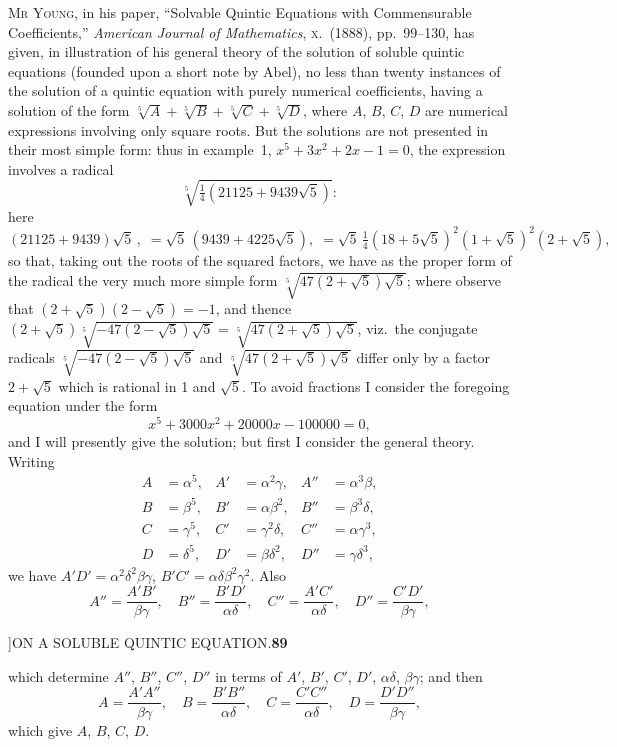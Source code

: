 \documentclass[11pt]{article}
\begin{document}
\hspace{1em} M\textsc{r} Y\textsc{oung}, in his paper, ``Solvable Quintic
Equations with Commensurable Coefficients,'' \emph{American Journal of
Mathematics}, \textsc{x}.\ (1888), pp.\ 99--130, has given, in illustration of
his general theory of the solution of soluble quintic equations (founded upon
a short note by Abel), no less than twenty instances of the solution of a
quintic equation with purely numerical coefficients, having a solution of the
form $\sqrt[5]{A}+\sqrt[5]{B}+\sqrt[5]{C}+\sqrt[5]{D}$, where $A$, $B$, $C$,
$D$ are numerical expressions involving only square roots. But the solutions
are not presented in their most simple form: thus in example~1,
$x^{5}+3x^{2}+2x-1=0$, the expression involves a radical
\[
\sqrt[5]{\tfrac{1}{4}(21125+9439\sqrt{5})}:
\]
here
\[
(21125+9439)\sqrt{5}\,,\;=\sqrt{5}\,(9439+4225\sqrt{5}),\;=\sqrt{5}\,\tfrac{1}{4}(18+5\sqrt{5})^{2}(1+\sqrt{5})^{2}(2+\sqrt{5}),
\]
so that, taking out the roots of the squared factors, we have as the proper
form of the radical the very much more simple form
$\sqrt[5]{47(2+\sqrt{5})\sqrt{5}}$; where observe that
$(2+\sqrt{5})(2-\sqrt{5})=-1$, and thence
$(2+\sqrt{5})\sqrt[5]{-47(2-\sqrt{5})\sqrt{5}}=\sqrt[5]{47(2+\sqrt{5})\sqrt{5}}$,
viz.\ the conjugate radicals $\sqrt[5]{-47(2-\sqrt{5})\sqrt{5}}$ and
$\sqrt[5]{47(2+\sqrt{5})\sqrt{5}}$ differ only by a factor $2+\sqrt{5}$ which
is rational in 1 and $\sqrt{5}$. To avoid fractions I consider the foregoing
equation under the form
\[
x^{5}+3000x^{2}+20000x-100000=0,
\]
and I will presently give the solution; but first I consider the general
theory. Writing
\[
\begin{aligned}
A &= \alpha^{5},& A' &= \alpha^{2}\gamma,& A''&=\alpha^{3}\beta,\\
B &= \beta^{5},& B' &= \alpha\beta^{2},& B'' &= \beta^{3}\delta,\\
C &= \gamma^{5},& C' &= \gamma^{2}\delta,& C''&=\alpha\gamma^{3},\\
D &= \delta^{5},& D' &= \beta\delta^{2},& D''&=\gamma\delta^{3},
\end{aligned}
\]
we have $A'D'=\alpha^{2}\delta^{2}\beta\gamma$,
$B'C'=\alpha\delta\beta^{2}\gamma^{2}$. Also
\[
A''=\frac{A'B'}{\beta\gamma},\quad B''=\frac{B'D'}{\alpha\delta},\quad
C''=\frac{A'C'}{\alpha\delta},\quad D''=\frac{C'D'}{\beta\gamma},
\]

\newpage
{}]\hfill ON A SOLUBLE QUINTIC EQUATION.\hfill\textbf{89}

\smallskip
which determine $A''$, $B''$, $C''$, $D''$ in terms of $A'$, $B'$, $C'$, $D'$,
$\alpha\delta$, $\beta\gamma$; and then
\[
A=\frac{A'A''}{\beta\gamma},\quad B=\frac{B'B''}{\alpha\delta},\quad
C=\frac{C'C''}{\alpha\delta},\quad D=\frac{D'D''}{\beta\gamma},
\]
which give $A$, $B$, $C$, $D$.
\end{document}
